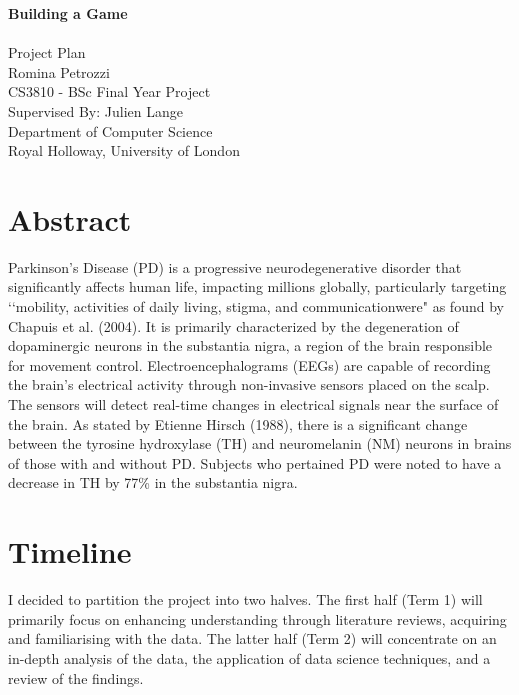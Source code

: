 \documentclass[12pt]{article}
\begin{document}
\begin{titlepage}
    \centering
    \vspace*{5cm}
    \LARGE\textbf{Building a Game}\\
    \vspace{1cm}
    \hrulefill\\[0.5cm] %
    \large Project Plan\\
    \vspace{0.5cm}
    \large Romina Petrozzi\\
    \vspace{0.5cm}
    \large CS3810 - BSc Final Year Project\\
    \vspace{2cm}
    \large Supervised By: Julien Lange\\
    \vspace{0.5cm}
    \large Department of Computer Science\\
    \large Royal Holloway, University of London\\
    \vfill
\end{titlepage}



\section*{\centering Abstract}
Parkinson's Disease (PD) is a progressive neurodegenerative disorder that significantly affects human life, impacting millions globally, particularly targeting ‘‘mobility, activities of daily living, stigma, and communicationwere" as found by  Chapuis et al. (2004). It is primarily characterized by the degeneration of dopaminergic neurons in the substantia nigra, a region of the brain responsible for movement control. Electroencephalograms (EEGs) are capable of recording the brain's electrical activity through non-invasive sensors placed on the scalp. The sensors will detect real-time changes in electrical signals near the surface of the brain. As stated by Etienne Hirsch (1988), there is a significant change between the tyrosine hydroxylase (TH) and neuromelanin (NM) neurons in brains of those with and without PD. Subjects who pertained PD were noted to have a decrease in TH by 77\% in the substantia nigra. 


\section{Timeline}
I decided to partition the project into two halves. The first half (Term 1) will primarily focus on enhancing understanding through literature reviews, acquiring and familiarising with the data. The latter half (Term 2) will concentrate on an in-depth analysis of the data, the application of data science techniques, and a review of the findings.
\end{document}
